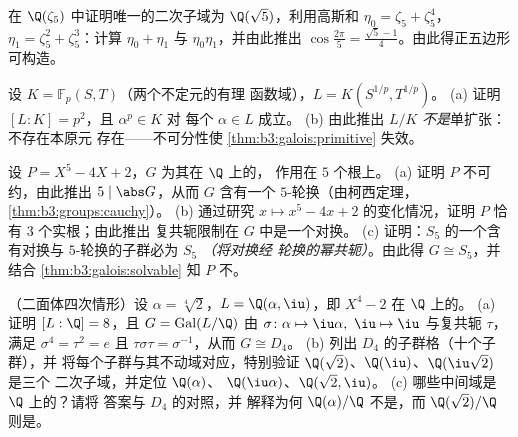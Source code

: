 \begin{exercise}[$\star\star$]\label{exo:b3:galois:9}
在 $\Q(\zeta_5)$ 中证明唯一的二次子域为
$\Q(\sqrt5)$，利用高斯和 $\eta_0 = \zeta_5 + \zeta_5^4$，
$\eta_1 = \zeta_5^2 + \zeta_5^3$：计算 $\eta_0 + \eta_1$ 与
$\eta_0\eta_1$，并由此推出 $\cos\frac{2\pi}5 = \frac{\sqrt5 -
1}4$。由此得正五边形可构造。
\end{exercise}

\begin{exercise}[$\star\star\star$]\label{exo:b3:galois:10}
设 $K = \mathbb F_p(S, T)$（两个不定元的有理
函数域），$L = K(S^{1/p}, T^{1/p})$。
(a) 证明 $[L:K] = p^2$，且 $\alpha^p \in K$ 对
每个 $\alpha \in L$ 成立。
(b) 由此推出 $L/K$ \emph{不是}单扩张：不存在本原元
存在——不可分性使
\cref{thm:b3:galois:primitive} 失效。
\end{exercise}

\begin{exercise}[$\star\star\star$]\label{exo:b3:galois:11}
设 $P = X^5 - 4X + 2$，$G$ 为其在 $\Q$ 上的，
作用在 $5$ 个根上。
(a) 证明 $P$ 不可约，由此推出 $5 \mid \abs G$，从而
$G$ 含有一个 $5$-轮换（由柯西定理，
\cref{thm:b3:groups:cauchy}）。
(b) 通过研究 $x \mapsto x^5 - 4x +
2$ 的变化情况，证明 $P$ 恰有 $3$ 个实根；由此推出
复共轭限制在 $G$ 中是一个对换。
(c) 证明：$S_5$ 的一个含有对换与
$5$-轮换的子群必为 $S_5$ \emph{（将对换经
轮换的幂共轭）}。由此得 $G \cong S_5$，并结合
\cref{thm:b3:galois:solvable} 知
$P$ 不。
\end{exercise}

\begin{exercise}[$\star\star\star$]\label{exo:b3:galois:12}
（二面体四次情形）设 $\alpha = \sqrt[4]2$，$L =
\Q(\alpha, \iu)$，即 $X^4 - 2$ 在 $\Q$ 上的。
(a) 证明 $[L : \Q] = 8$，且 $G =
\operatorname{Gal}(L/\Q)$ 由 $\sigma\colon
\alpha \mapsto \iu\alpha,\ \iu \mapsto \iu$ 与复共轭
$\tau$，满足 $\sigma^4 = \tau^2 = e$ 且
$\tau\sigma\tau = \sigma^{-1}$，从而 $G \cong D_4$。
(b) 列出 $D_4$ 的子群格（十个子群），并
将每个子群与其不动域对应，特别验证
$\Q(\sqrt2)$、$\Q(\iu)$、$\Q(\iu\sqrt2)$ 是三个
二次子域，并定位 $\Q(\alpha)$、
$\Q(\iu\alpha)$、$\Q(\sqrt2, \iu)$。
(c) 哪些中间域是 $\Q$ 上的？请将
答案与 $D_4$ 的对照，并
解释为何 $\Q(\alpha)/\Q$ 不是，而 $\Q(\sqrt2)/\Q$
则是。
\end{exercise}

